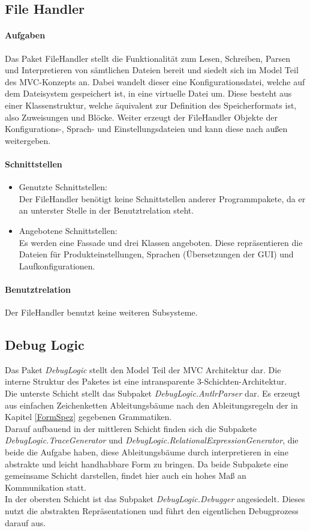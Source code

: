 \documentclass[parskip=full]{scrartcl}
\begin{document}
\subsection{File Handler}
\paragraph{Aufgaben}
Das Paket FileHandler stellt die Funktionalität zum Lesen, Schreiben, Parsen und Interpretieren von sämtlichen Dateien bereit und siedelt sich im Model Teil des MVC-Konzepts an.
Dabei wandelt dieser eine Konfigurationsdatei, welche auf dem Dateisystem gespeichert ist, in eine virtuelle Datei um.
Diese besteht aus einer Klassenstruktur, welche äquivalent zur Definition des Speicherformats ist, also Zuweisungen und Blöcke.
Weiter erzeugt der FileHandler Objekte der Konfigurations-, Sprach- und Einstellungsdateien und kann diese nach außen weitergeben.
\paragraph{Schnittstellen}
\begin{itemize}
\item Genutzte Schnittstellen: \\
Der FileHandler benötigt keine Schnittstellen anderer Programmpakete, da er an unterster Stelle in der Benutztrelation steht.
\item Angebotene Schnittstellen: \\
Es werden eine Fassade und drei Klassen angeboten.
Diese repräsentieren die Dateien für Produkteinstellungen, Sprachen (Übersetzungen der GUI) und Laufkonfigurationen.

\end{itemize}
\paragraph{Benutztrelation}
Der FileHandler benutzt keine weiteren Subsysteme.

\subsection{Debug Logic}
Das Paket \textit{DebugLogic} stellt den Model Teil der MVC Architektur dar. Die interne Struktur des Paketes ist eine intransparente 3-Schichten-Architektur.\\
Die unterste Schicht stellt das Subpaket \textit{DebugLogic.AntlrParser} dar. Es erzeugt aus einfachen Zeichenketten Ableitungsbäume nach den Ableitungsregeln der in Kapitel \ref{FormSpez} gegebenen Grammatiken.\\ Darauf aufbauend in der mittleren Schicht finden sich die Subpakete \textit{DebugLogic.TraceGenerator} und \textit{DebugLogic.RelationalExpressionGenerator}, die beide die Aufgabe haben, diese Ableitungsbäume durch interpretieren in eine abstrakte und leicht handhabbare Form zu bringen. Da beide Subpakete eine gemeinsame Schicht darstellen, findet hier auch ein hohes Maß an Kommunikation statt. \\ In der obersten Schicht ist das Subpaket \textit{DebugLogic.Debugger} angesiedelt. Dieses nutzt die abstrakten Repräsentationen und führt den eigentlichen Debugprozess darauf aus.
\end{document}
